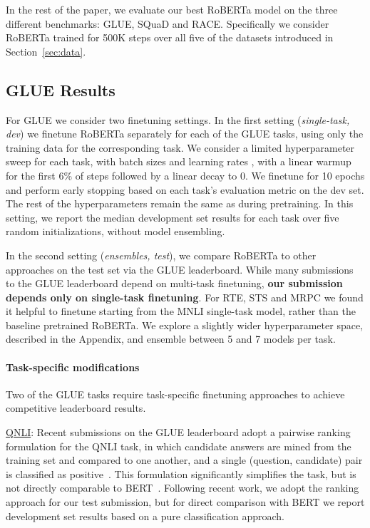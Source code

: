\documentclass[11pt]{article}
\newcommand{\ourmodel}{RoBERTa}
\begin{document}
In the rest of the paper, we evaluate our best \ourmodel{} model on the three different benchmarks: GLUE, SQuaD and RACE.
Specifically we consider \ourmodel{} trained for 500K steps over all five of the datasets introduced in Section~\ref{sec:data}.

\subsection{GLUE Results} \label{sec:results_glue}

For GLUE we consider two finetuning settings.
In the first setting (\emph{single-task, dev}) we finetune \ourmodel{} separately for each of the GLUE tasks, using only the training data for the corresponding task.
We consider a limited hyperparameter sweep for each task, with batch sizes  and learning rates , with a linear warmup for the first 6\% of steps followed by a linear decay to 0.
We finetune for 10 epochs and perform early stopping based on each task's evaluation metric on the dev set.
The rest of the hyperparameters remain the same as during pretraining.
In this setting, we report the median development set results for each task over five random initializations, without model ensembling.

In the second setting (\emph{ensembles, test}), we compare \ourmodel{} to other approaches on the test set via the GLUE leaderboard.
While many submissions to the GLUE leaderboard depend on multi-task finetuning, \textbf{our submission depends only on single-task finetuning}.
For RTE, STS and MRPC we found it helpful to finetune starting from the MNLI single-task model, rather than the baseline pretrained \ourmodel{}.
We explore a slightly wider hyperparameter space, described in the Appendix, and ensemble between 5 and 7 models per task.

\paragraph{Task-specific modifications}

Two of the GLUE tasks require task-specific finetuning approaches to achieve competitive leaderboard results.

\underline{QNLI}:
Recent submissions on the GLUE leaderboard adopt a pairwise ranking formulation for the QNLI task, in which candidate answers are mined from the training set and compared to one another, and a single (question, candidate) pair is classified as positive~\cite{liu2019mtdnn,liu2019improving,yang2019xlnet}.
This formulation significantly simplifies the task, but is not directly comparable to BERT~\cite{devlin2018bert}.
Following recent work, we adopt the ranking approach for our test submission, but for direct comparison with BERT we report development set results based on a pure classification approach.
\end{document}
